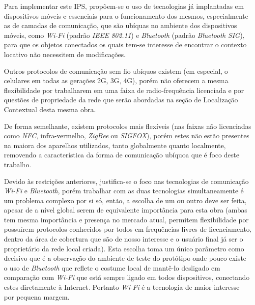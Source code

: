 Para implementar este IPS, propõem-se o uso de tecnologias já implantadas em
dispositivos móveis e essenciais para o funcionamento dos mesmos, especialmente
as de camadas de comunicação, que são ubíquas no ambiente dos dispositivos
móveis, como \emph{Wi-Fi} (padrão \emph{IEEE 802.11}) e \emph{Bluetooth}
(padrão \emph{Bluetooth SIG}), para que os objetos conectados os quais tem-se
interesse de encontrar o contexto locativo não necessitem de modificações.

Outros protocolos de comunicação sem fio ubíquos existem (em especial, o
celulares em todas as gerações 2G, 3G, 4G), porém não oferecem a mesma
flexibilidade por trabalharem em uma faixa de radio-frequência licenciada e por
questões de propriedade da rede que serão abordadas na seção de Localização
Contextual desta mesma obra.

De forma semelhante, existem protocolos mais flexíveis (nas faixas não
licenciadas como \emph{NFC}, infra-vermelho, \emph{ZigBee} ou
\emph{SIGFOX}), porém estes não estão presentes na maiora dos aparelhos
utilizados, tanto globalmente quanto localmente, removendo a característica da
forma de comunicação ubíquoa que é foco deste trabalho.

Devido às restrições anteriores, justifica-se o foco nas tecnologias de
comunicação \emph{Wi-Fi} e \emph{Bluetooth}, porém trabalhar com as duas
tecnologias simultaneamente é um problema complexo por si só, então, a escolha
de um ou outro deve ser feita, apesar de a nível global serem de equivalente importância para
esta obra (ambas tem mesma importância e presença no mercado atual, permitem
flexibilidade por possuírem protocolos conhecidos por todos em frequências
livres de licenciamento, dentro da área de cobertura que são de nosso interesse
e o usuário final já ser o proprietário da rede local criada).
Esta escolha toma um único parâmetro como decisivo que é a observação do
ambiente de teste do protótipo onde pouco existe o uso de \emph{Bluetooth}  que
reflete o costume local de mantê-lo desligado em comparação com \emph{Wi-Fi}
que está sempre ligado em todos dispositivos, conectando estes diretamente à
Internet. Portanto \emph{Wi-Fi} é a tecnologia de maior interesse por pequena
margem.
